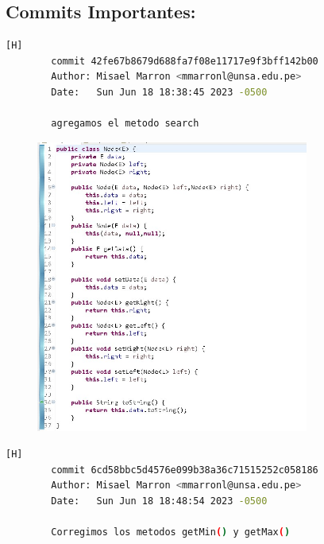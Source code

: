 \documentclass{article}
\begin{document}
	\subsection{Commits Importantes:}
	\begin{lstlisting}[language=bash,caption={Mi primer commit importante es cuando agregue el metodo search .}][H]
		commit 42fe67b8679d688fa7f08e11717e9f3bff142b00
		Author: Misael Marron <mmarronl@unsa.edu.pe>
		Date:   Sun Jun 18 18:38:45 2023 -0500

    	agregamos el metodo search
	\end{lstlisting}
	
	\begin{figure}[H]
		\centering
		\includegraphics[width=0.8\textwidth,keepaspectratio]{img/codigo1.jpg}
	\end{figure}
	
	
		
	 \begin{lstlisting}[language=bash,caption={Mi segundo commit mas importante es cuando agregue los metodos getmin y get max .}][H]
		commit 6cd58bbc5d4576e099b38a36c71515252c058186
		Author: Misael Marron <mmarronl@unsa.edu.pe>
		Date:   Sun Jun 18 18:48:54 2023 -0500

    	Corregimos los metodos getMin() y getMax()
	\end{lstlisting}
	
\end{document}

